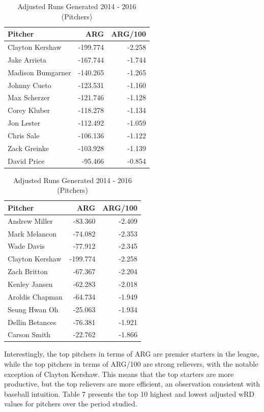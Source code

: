 \documentclass[11pt]{article}
\begin{document}
\begin{table}[ht]
\centering
\begin{tabular}{lrr}
  \hline
Pitcher & ARG & ARG/100 \\ 
  \hline
Clayton Kershaw & -199.774 & -2.258 \\ 
  Jake Arrieta & -167.744 & -1.744 \\ 
  Madison Bumgarner & -140.265 & -1.265 \\ 
  Johnny Cueto & -123.531 & -1.160 \\ 
  Max Scherzer & -121.746 & -1.128 \\ 
  Corey Kluber & -118.278 & -1.134 \\ 
  Jon Lester & -112.492 & -1.059 \\ 
  Chris Sale & -106.136 & -1.122 \\ 
  Zack Greinke & -103.928 & -1.139 \\ 
  David Price & -95.466 & -0.854 \\ 
   \hline
\end{tabular}
\quad
\begin{tabular}{lrr}
  \hline
Pitcher & ARG & ARG/100\\ 
  \hline
Andrew Miller & -83.360 & -2.409 \\ 
  Mark Melancon & -74.082 & -2.353 \\ 
  Wade Davis & -77.912 & -2.345 \\ 
  Clayton Kershaw & -199.774 & -2.258 \\ 
  Zach Britton & -67.367 & -2.204 \\ 
  Kenley Jansen & -62.283 & -2.018 \\ 
  Aroldis Chapman & -64.734 & -1.949 \\ 
  Seung Hwan Oh & -25.063 & -1.934 \\ 
  Dellin Betances & -76.381 & -1.921 \\ 
  Carson Smith & -22.762 & -1.866 \\ 
   \hline
\end{tabular}
\caption{Adjusted Runs Generated 2014 - 2016 (Pitchers)}
\end{table}

\newpage 
Interestingly, the top pitchers in terms of ARG are premier starters in the league, while the top pitchers in terms of ARG/100 are strong relievers, with the notable exception of Clayton Kershaw.  This means that the top starters are more productive, but the top relievers are more efficient, an observation consistent with baseball intuition.  Table 7 presents the top 10 highest and lowest adjusted wRD values for pitchers over the period studied.
\end{document}
